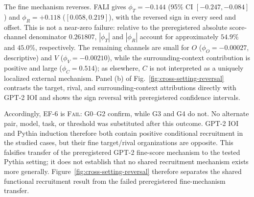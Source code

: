 The fine mechanism reverses. FALI gives $\phi_T=-0.144$ (95\% CI $[-0.247,-0.084]$) and $\phi_R=+0.118$ ($[0.058,0.219]$), with the reversed sign in every seed and offset. This is not a near-zero failure: relative to the preregistered absolute score-channel denominator $0.261807$, $|\phi_T|$ and $|\phi_R|$ account for approximately $54.9\%$ and $45.0\%$, respectively. The remaining channels are small for $O$ ($\phi_O=-0.00027$, descriptive) and $V$ ($\phi_V=-0.00210$), while the surrounding-context contribution is positive and large ($\phi_C=0.514$); as elsewhere, $C$ is not interpreted as a uniquely localized external mechanism. Panel (b) of Fig.~\ref{fig:cross-setting-reversal} contrasts the target, rival, and surrounding-context attributions directly with GPT-2 IOI and shows the sign reversal with preregistered confidence intervals.

Accordingly, EF-6 is \textsc{Fail}: G0--G2 confirm, while G3 and G4 do not. No alternate pair, model, task, or threshold was substituted after this outcome. GPT-2 IOI and Pythia induction therefore both contain positive conditional recruitment in the studied cases, but their fine target/rival organizations are opposite. This falsifies transfer of the preregistered GPT-2 fine-score mechanism to the tested Pythia setting; it does not establish that no shared recruitment mechanism exists more generally. Figure~\ref{fig:cross-setting-reversal} therefore separates the shared functional recruitment result from the failed preregistered fine-mechanism transfer.


